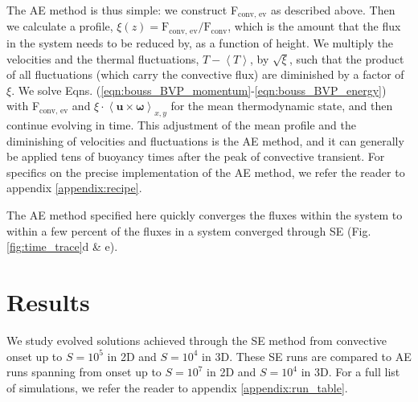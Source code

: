 \documentclass[aps, pre, onecolumn, nofootinbib, notitlepage, groupedaddress, amsfonts, amssymb, amsmath, longbibliography]{revtex4-1}
\newcommand{\angles}[1]{\ensuremath{\left\langle #1 \right\rangle}}
\begin{document}
The AE method is thus simple: we construct F$_{\text{conv, ev}}$ as described above.
Then we calculate a profile, 
$\xi(z) = \text{F}_{\text{conv, ev}}/\text{F}_{\text{conv}}$, which is the amount that the
flux in the system needs to be reduced by, as a function of height.
We multiply the velocities
and the thermal fluctuations, $T - \angles{T}$, by $\sqrt{\xi}$, such that the product of all fluctuations
(which carry the convective flux) are diminished by a factor of $\xi$.  We solve
Eqns. (\ref{eqn:bouss_BVP_momentum}-\ref{eqn:bouss_BVP_energy}) with F$_{\text{conv, ev}}$
and $\xi\cdot\angles{\bm{u}\times\bm{\omega}}_{x,y}$ for the mean thermodynamic state,
and then continue evolving in time.  This adjustment of the mean profile and the
diminishing of velocities and fluctuations is the AE method, and it can generally
be applied tens of buoyancy times after the peak of convective transient.
For specifics on the precise implementation of the AE method, we refer
the reader to appendix \ref{appendix:recipe}.

The AE method specified here quickly converges the fluxes within the
system to within a few percent of the fluxes in a system converged through
SE (Fig. \ref{fig:time_trace}d \& e).

\section{Results}
\label{sec:results}
We study evolved solutions achieved through the SE method from convective onset
up to $S = 10^5$ in 2D and $S = 10^4$ in 3D.  These SE runs are compared to
AE runs spanning from onset up to $S = 10^7$ in 2D and $S = 10^4$ in 3D.
For a full list of simulations, we refer the reader to appendix \ref{appendix:run_table}.
\end{document}
